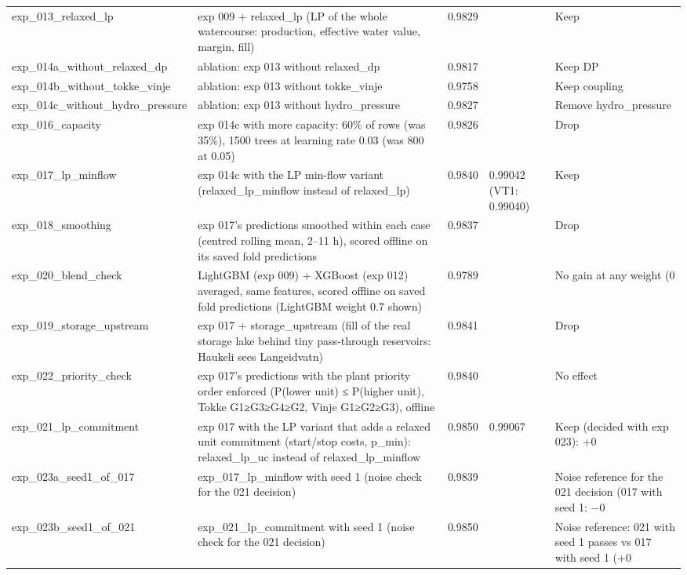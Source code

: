 \begin{longtable}{p{4.4cm}p{5.2cm}llp{2.4cm}}
exp\_013\_relaxed\_lp & exp 009 + relaxed\_lp (LP of the whole watercourse: production, effective water value, margin, fill) & 0.9829 &  & Keep \\
exp\_014a\_without\_relaxed\_dp & ablation: exp 013 without relaxed\_dp & 0.9817 &  & Keep DP \\
exp\_014b\_without\_tokke\_vinje & ablation: exp 013 without tokke\_vinje & 0.9758 &  & Keep coupling \\
exp\_014c\_without\_hydro\_pressure & ablation: exp 013 without hydro\_pressure & 0.9827 &  & Remove hydro\_pressure \\
exp\_016\_capacity & exp 014c with more capacity: 60\% of rows (was 35\%), 1500 trees at learning rate 0.03 (was 800 at 0.05) & 0.9826 &  & Drop \\
exp\_017\_lp\_minflow & exp 014c with the LP min-flow variant (relaxed\_lp\_minflow instead of relaxed\_lp) & 0.9840 & 0.99042 (VT1: 0.99040) & Keep \\
exp\_018\_smoothing & exp 017's predictions smoothed within each case (centred rolling mean, 2–11 h), scored offline on its saved fold predictions & 0.9837 &  & Drop \\
exp\_020\_blend\_check & LightGBM (exp 009) + XGBoost (exp 012) averaged, same features, scored offline on saved fold predictions (LightGBM weight 0.7 shown) & 0.9789 &  & No gain at any weight (0 \\
exp\_019\_storage\_upstream & exp 017 + storage\_upstream (fill of the real storage lake behind tiny pass-through reservoirs: Haukeli sees Langeidvatn) & 0.9841 &  & Drop \\
exp\_022\_priority\_check & exp 017's predictions with the plant priority order enforced (P(lower unit) ≤ P(higher unit), Tokke G1≥G3≥G4≥G2, Vinje G1≥G2≥G3), offline & 0.9840 &  & No effect \\
exp\_021\_lp\_commitment & exp 017 with the LP variant that adds a relaxed unit commitment (start/stop costs, p\_min): relaxed\_lp\_uc instead of relaxed\_lp\_minflow & 0.9850 & 0.99067 & Keep (decided with exp 023): +0 \\
exp\_023a\_seed1\_of\_017 & exp\_017\_lp\_minflow with seed 1 (noise check for the 021 decision) & 0.9839 &  & Noise reference for the 021 decision (017 with seed 1: −0 \\
exp\_023b\_seed1\_of\_021 & exp\_021\_lp\_commitment with seed 1 (noise check for the 021 decision) & 0.9850 &  & Noise reference: 021 with seed 1 passes vs 017 with seed 1 (+0 \\

\end{longtable}
